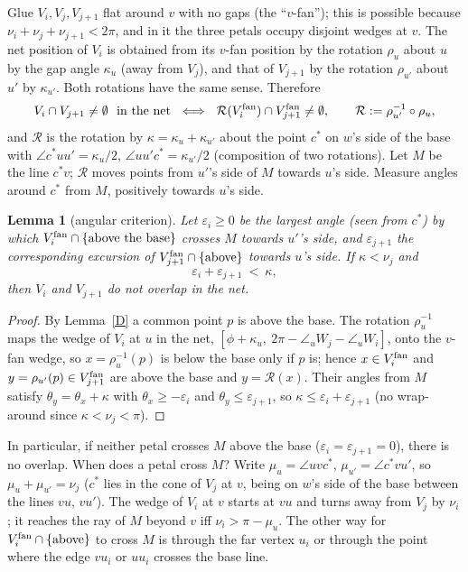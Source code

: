 \documentclass[11pt]{article}
\newtheorem{lemma}{Lemma}
\theoremstyle{definition}
\theoremstyle{remark}
\newcommand{\R}{\mathcal{R}}
\begin{document}
Glue $V_i,V_j,V_{j+1}$ flat around $v$ with no gaps (the ``$v$-fan''); this is possible because
$\nu_i+\nu_j+\nu_{j+1}<2\pi$, and in it the three petals occupy disjoint wedges at $v$. The net position of
$V_i$ is obtained from its $v$-fan position by the rotation $\rho_u$ about $u$ by the gap angle $\kappa_u$
(away from $V_j$), and that of $V_{j+1}$ by the rotation $\rho_{u'}$ about $u'$ by $\kappa_{u'}$. Both
rotations have the same sense. Therefore
\[
 V_i\cap V_{j+1}\neq\emptyset\ \text{ in the net }\iff\ \R(V_i^{\rm fan})\cap V_{j+1}^{\rm fan}\neq\emptyset,
 \qquad \R:=\rho_{u'}^{-1}\circ\rho_u,
\]
and $\R$ is the rotation by $\kappa=\kappa_u+\kappa_{u'}$ about the point $c^*$ on $w$'s side of the base
with $\angle c^*uu'=\kappa_u/2$, $\angle uu'c^*=\kappa_{u'}/2$ (composition of two rotations).
Let $M$ be the line $c^*v$; $\R$ moves points from $u'$'s side of $M$ towards $u$'s side. Measure angles
around $c^*$ from $M$, positively towards $u$'s side.

\begin{lemma}[angular criterion]\label{angular}
Let $\varepsilon_i\ge0$ be the largest angle (seen from $c^*$) by which $V_i^{\rm fan}\cap\{\text{above the base}\}$
crosses $M$ towards $u'$'s side, and $\varepsilon_{j+1}$ the corresponding excursion of
$V_{j+1}^{\rm fan}\cap\{\text{above}\}$ towards $u$'s side. If $\kappa<\nu_j$ and
\begin{equation}\label{epscrit}
 \varepsilon_i+\varepsilon_{j+1}\ <\ \kappa ,
\end{equation}
then $V_i$ and $V_{j+1}$ do not overlap in the net.
\end{lemma}
\begin{proof}
By Lemma~\ref{D} a common point $p$ is above the base. The rotation $\rho_u^{-1}$ maps the wedge of $V_i$ at
$u$ in the net, $[\phi+\kappa_u,\ 2\pi-\angle_uW_j-\angle_uW_i]$, onto the $v$-fan wedge, so $x=\rho_u^{-1}(p)$
is below the base only if $p$ is; hence $x\in V_i^{\rm fan}$ and $y=\rho_{u'}(p)\in V_{j+1}^{\rm fan}$ are above the
base and $y=\R(x)$. Their angles from $M$ satisfy $\theta_y=\theta_x+\kappa$ with
$\theta_x\ge-\varepsilon_i$ and $\theta_y\le\varepsilon_{j+1}$, so $\kappa\le\varepsilon_i+\varepsilon_{j+1}$
(no wrap-around since $\kappa<\nu_j<\pi$).
\end{proof}

In particular, if neither petal crosses $M$ above the base ($\varepsilon_i=\varepsilon_{j+1}=0$), there is no
overlap. When does a petal cross $M$? Write $\mu_u=\angle uvc^*$, $\mu_{u'}=\angle c^*vu'$, so
$\mu_u+\mu_{u'}=\nu_j$ ($c^*$ lies in the cone of $V_j$ at $v$, being on $w$'s side of the base between the
lines $vu$, $vu'$). The wedge of $V_i$ at $v$ starts at $vu$ and turns away from $V_j$ by $\nu_i$; it reaches
the ray of $M$ beyond $v$ iff $\nu_i>\pi-\mu_u$. The other way for $V_i^{\rm fan}\cap\{\text{above}\}$ to cross $M$
is through the far vertex $u_i$ or through the point where the edge $vu_i$ or $uu_i$ crosses the base line.
\end{document}
